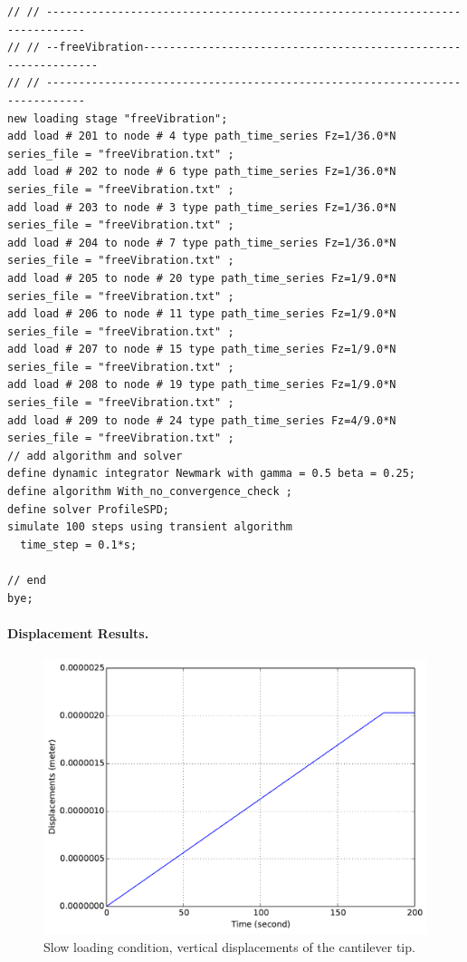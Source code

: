 \documentclass[fleqn,11pt]{article}
\begin{document}
\begin{lstlisting}
// // ----------------------------------------------------------------------------
// // --freeVibration---------------------------------------------------------------
// // ----------------------------------------------------------------------------
new loading stage "freeVibration";
add load # 201 to node # 4 type path_time_series Fz=1/36.0*N series_file = "freeVibration.txt" ; 
add load # 202 to node # 6 type path_time_series Fz=1/36.0*N series_file = "freeVibration.txt" ; 
add load # 203 to node # 3 type path_time_series Fz=1/36.0*N series_file = "freeVibration.txt" ; 
add load # 204 to node # 7 type path_time_series Fz=1/36.0*N series_file = "freeVibration.txt" ; 
add load # 205 to node # 20 type path_time_series Fz=1/9.0*N series_file = "freeVibration.txt" ; 
add load # 206 to node # 11 type path_time_series Fz=1/9.0*N series_file = "freeVibration.txt" ; 
add load # 207 to node # 15 type path_time_series Fz=1/9.0*N series_file = "freeVibration.txt" ; 
add load # 208 to node # 19 type path_time_series Fz=1/9.0*N series_file = "freeVibration.txt" ; 
add load # 209 to node # 24 type path_time_series Fz=4/9.0*N series_file = "freeVibration.txt" ; 
// add algorithm and solver
define dynamic integrator Newmark with gamma = 0.5 beta = 0.25;
define algorithm With_no_convergence_check ;
define solver ProfileSPD;
simulate 100 steps using transient algorithm 
  time_step = 0.1*s;

// end
bye;
\end{lstlisting}

\paragraph{Displacement Results.} 

\begin{figure}[!htb]
  \centering
  \includegraphics[width=12cm]{../Figure-files/_Chapter_Appendix_Illustrative_Examples/brick-mass-1element-slowLoading.pdf}
  \caption{Slow loading condition, vertical displacements of the cantilever tip.}
  \label{fig_27brick-mass-slow}
\end{figure}
\end{document}

